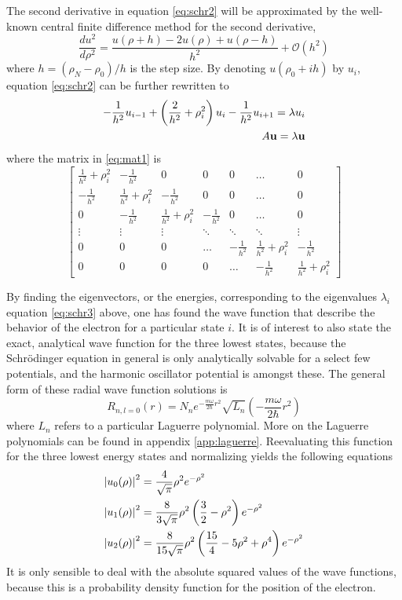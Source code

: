 \documentclass[10pt, a4paper]{amsart}
\begin{document}
The second derivative in equation \ref{eq:schr2} will be approximated by the well-known central finite difference method for the second derivative,
\begin{equation}
\frac{du^2}{d\rho^2}=\frac{u(\rho+h)-2u(\rho)+u(\rho-h)}{h^2}+\mathcal{O}(h^2)
\end{equation}
where $h = (\rho_N-\rho_0)/h$ is the step size. By denoting $u(\rho_0+ih)$ by $u_i$, equation \ref{eq:schr2} can be further rewritten to
\begin{align}
-\frac{1}{h^2}u_{i-1}+\left(\frac{2}{h^2} + \rho_i^2 \right)u_i-\frac{1}{h^2}u_{i+1}=\lambda u_i \label{eq:schr3}\\
A\vb{u} = \lambda \vb{u} \label{eq:mat1}
\end{align} 
where the matrix in \ref{eq:mat1} is
\begin{equation}
\begin{bmatrix}
\frac{1}{h^2} + \rho_i^2 & -\frac{1}{h^2} & 0 & 0 & 0 & \dots & 0 \\
-\frac{1}{h^2} & \frac{1}{h^2} + \rho_i^2 & -\frac{1}{h^2} & 0 & 0 & \dots & 0 \\
0 & -\frac{1}{h^2} & \frac{1}{h^2} + \rho_i^2 & -\frac{1}{h^2} & 0 & \dots & 0  \\
\vdots & \vdots & \vdots &\ddots & \ddots & \ddots & \vdots \\
0 & 0 & 0 & \dots &  -\frac{1}{h^2} & \frac{1}{h^2} + \rho_i^2 & -\frac{1}{h^2} \\
0 & 0 & 0 & 0 & \dots & -\frac{1}{h^2} & \frac{1}{h^2} + \rho_i^2 
\end{bmatrix}
\end{equation}

By finding the eigenvectors, or the energies, corresponding to the eigenvalues $\lambda_i$  equation \ref{eq:schr3} above, one has found the wave function that describe the behavior of the electron for a particular state $i$. It is of interest to also state the exact, analytical wave function for the three lowest states, because the Schrödinger equation in general is only analytically solvable for a select few potentials, and the harmonic oscillator potential is amongst these. The general form of these radial wave function solutions is 
\begin{equation}
\label{eq:radialschr1}
R_{n,l=0}(r)=N_ne^{-\frac{m\omega}{2\hbar}r^2}\sqrt{L_n}\left(-\frac{m\omega}{2\hbar} r^2 \right)
\end{equation}
where $L_n$ refers to a particular Laguerre polynomial. More on the Laguerre polynomials can be found in appendix \ref{app:laguerre}. Reevaluating this function for the three lowest energy states and normalizing yields the following equations
\begin{align}
\abs{u_0(\rho)}^2 &= \frac{4}{\sqrt{\pi}}\rho^2e^{-\rho^2} \\
\abs{u_1(\rho)}^2 &= \frac{8}{3\sqrt{\pi}}\rho^2\left( \frac{3}{2}-\rho^2 \right)e^{-\rho^2} \\
\abs{u_2(\rho)}^2 &= \frac{8}{15\sqrt{\pi}}\rho^2\left( \frac{15}{4}-5\rho^2 +\rho^4\right)e^{-\rho^2}
\end{align}
It is only sensible to deal with the absolute squared values of the wave functions, because this is a probability density function for the position of the electron.
\end{document}
